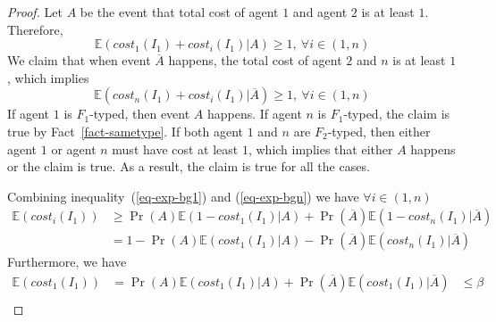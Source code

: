 \documentclass[twoside,11pt]{article}
\begin{document}
\begin{proof}
\noindent
Let $A$ be the event that total cost of agent $1$ and agent $2$ is at least $1$.
Therefore,
\begin{equation}\label{eq-exp-bg1}
\mathbb{E}(cost_1(I_1) + cost_i(I_1)|A) \ge 1, ~\forall i \in (1,n)
\end{equation}
We claim that when event $\overline{A}$ happens, the total cost of agent $2$ and $n$ is at least $1$, which implies
\begin{equation} \label{eq-exp-bgn}
\mathbb{E}(cost_n(I_1) + cost_i(I_1)|\overline{A}) \ge 1, ~\forall i \in (1,n)
\end{equation}
If agent $1$ is $F_1$-typed, then event $A$ happens.
If agent $n$ is $F_1$-typed, the claim is true  by Fact~\ref{fact-sametype}.
If both agent $1$ and $n$ are $F_2$-typed, then either agent $1$ or agent $n$ must have cost at least $1$, which implies that either $A$ happens or the claim is true.
As a result, the claim is true for all the cases.

\noindent
Combining inequality~(\ref{eq-exp-bg1}) and (\ref{eq-exp-bgn}) we have $\forall i \in (1,n)$
\begin{equation}
\begin{array}{ll}\label{eq-exp-I1c}
\mathbb{E}(cost_i(I_1)) &\ge \Pr({A})   \mathbb{E}(1 - cost_1(I_1)|A)  +  \Pr(\overline{A}) \mathbb{E}(1 - cost_n(I_1)|\overline{A}) \\
&= 1 - \Pr({A}) \mathbb{E}( cost_1(I_1)|A)  -  \Pr(\overline{A}) \mathbb{E}(cost_n(I_1)|\overline{A})
\end{array}
\end{equation}
Furthermore, we have
\begin{equation}\label{eq-exp-a1an}
\begin{array}{lll}
\mathbb{E}(cost_1(I_1)) &=
\Pr(A)\mathbb{E}(cost_1(I_1)|A)
+ \Pr(\overline{A})\mathbb{E}(cost_1(I_1)|\overline{A}) &\le  \beta \\


\end{array}
\end{equation}
\end{proof}
\end{document}
